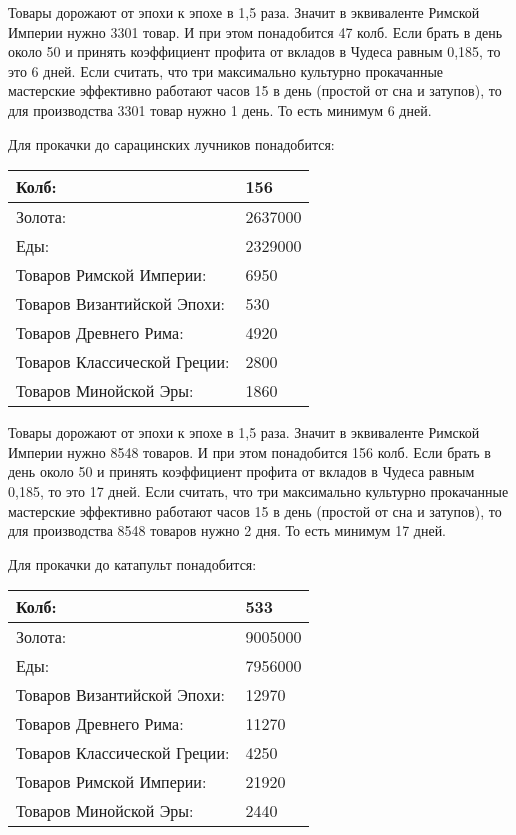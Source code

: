 Товары дорожают от эпохи к эпохе в 1,5 раза.
Значит в эквиваленте Римской Империи нужно 3301 товар.
И при этом понадобится 47 колб. Если брать в день около 50 и принять коэффициент профита от вкладов
в Чудеса равным 0,185, то это 6 дней.
Если считать, что три максимально культурно прокачанные мастерские эффективно работают часов 15 в день (простой от сна и затупов),
то для производства 3301 товар нужно 1 день.
То есть минимум 6 дней.


Для прокачки до сарацинских лучников понадобится:

\begin{center}
    \begin{tabular}[h!]{|l|l|}
        \hline
        Колб:   & 156 \\\hline
        Золота: & 2637000 \\\hline
        Еды:    & 2329000 \\\hline
        Товаров Римской Империи: & 6950 \\\hline
        Товаров Византийской Эпохи: & 530 \\\hline
        Товаров Древнего Рима: & 4920 \\\hline
        Товаров Классической Греции: & 2800 \\\hline
        Товаров Минойской Эры: & 1860 \\\hline
    \end{tabular}
\end{center}

Товары дорожают от эпохи к эпохе в 1,5 раза.
Значит в эквиваленте Римской Империи нужно 8548 товаров.
И при этом понадобится 156 колб. Если брать в день около 50 и принять коэффициент профита от вкладов
в Чудеса равным 0,185, то это 17 дней.
Если считать, что три максимально культурно прокачанные мастерские эффективно работают часов 15 в день (простой от сна и затупов),
то для производства 8548 товаров нужно 2 дня.
То есть минимум 17 дней.


Для прокачки до катапульт понадобится:

\begin{center}
    \begin{tabular}[h!]{|l|l|}
        \hline
        Колб:   & 533 \\\hline
        Золота: & 9005000 \\\hline
        Еды:    & 7956000 \\\hline
        Товаров Византийской Эпохи: & 12970 \\\hline
        Товаров Древнего Рима: & 11270 \\\hline
        Товаров Классической Греции: & 4250 \\\hline
        Товаров Римской Империи: & 21920 \\\hline
        Товаров Минойской Эры: & 2440 \\\hline
    \end{tabular}
\end{center}

